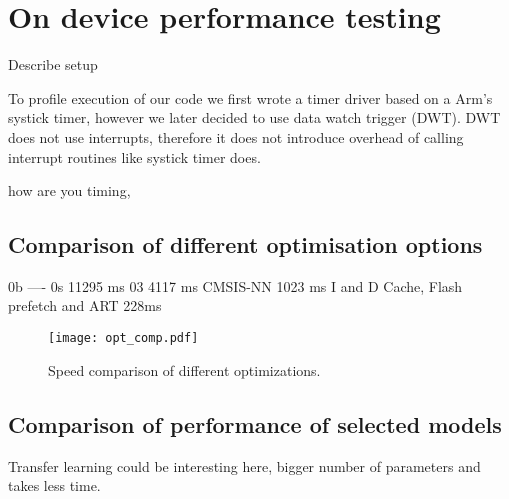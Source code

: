 \section{ On device performance testing}
Describe setup

To profile execution of our code we first wrote a timer driver based on a Arm's systick timer, however we later decided to use data watch trigger (DWT).
DWT does not use interrupts, therefore it does not introduce overhead of calling interrupt routines like systick timer does.


      how are you timing, 


\subsection{ Comparison of different optimisation options}

0b
----
0s 11295 ms
03 4117  ms
CMSIS-NN 1023 ms
I and D Cache, Flash prefetch and ART 228ms

\begin{figure}[ht]
    \centering
    \texttt{[image: opt\_comp.pdf]}
    \caption{ Speed comparison of different optimizations.}
    \label{opt_comp}
\end{figure}


\subsection{ Comparison of performance of selected models}
    Transfer learning could be interesting here, bigger number of parameters and takes less time.



